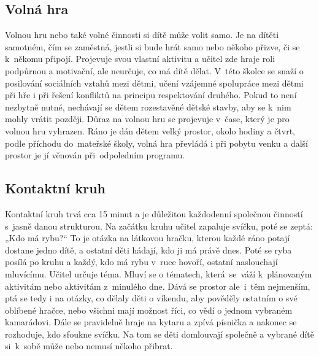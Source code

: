 		\subsection{Volná hra}
			Volnou hru nebo také volné činnosti si dítě může volit samo. Je na dítěti samotném, čím se zaměstná, jestli si bude hrát samo nebo někoho přizve, či se k někomu připojí. Projevuje svou vlastní aktivitu a učitel zde hraje roli podpůrnou a motivační, ale neurčuje, co má dítě dělat. V této školce se snaží o posilování sociálních vztahů mezi dětmi, učení vzájemné spolupráce mezi dětmi při hře i při řešení konfliktů na principu respektování druhého. Pokud to není nezbytně nutné, nechávají se dětem rozestavěné dětské stavby, aby se k nim mohly vrátit později. Důraz na volnou hru se projevuje v čase, který je pro volnou hru vyhrazen. Ráno je dán dětem velký prostor, okolo hodiny a čtvrt, podle příchodu do mateřské školy, volná hra převládá i při pobytu venku a další prostor je jí věnován při odpoledním programu. 

		\subsection{Kontaktní kruh}
			Kontaktní kruh trvá cca 15 minut a je důležitou každodenní společnou činností s jasně danou strukturou. Na začátku kruhu učitel zapaluje svíčku, poté se zeptá: „Kdo má rybu?“ To je otázka na látkovou hračku, kterou každé ráno potají dostane jedno dítě, a ostatní děti hádají, kdo ji má právě dnes. Poté se ryba posílá po kruhu a každý, kdo má rybu v ruce hovoří, ostatní naslouchají mluvícímu. Učitel určuje téma. Mluví se o tématech, která se váží k plánovaným aktivitám nebo aktivitám z minulého dne. Dává se prostor ale i těm nejmenším, ptá se tedy i na otázky, co dělaly děti o víkendu, aby pověděly ostatním o své oblíbené hračce, nebo všichni mají možnost říci, co vědí o jednom vybraném kamarádovi. Dále se pravidelně hraje na kytaru a zpívá písnička a nakonec se rozhoduje, kdo sfoukne svíčku. Na tom se děti domlouvají společně a vybrané dítě si k sobě může nebo nemusí někoho přibrat. 

